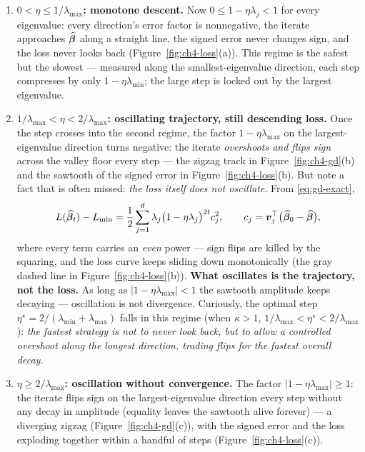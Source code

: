 \begin{enumerate}[label=Regime \arabic*:, leftmargin=5.5em]
  \item \textbf{$0 < \eta \le 1/\lambda_{\max}$: monotone descent.} Now $0 \le 1 - \eta\lambda_j < 1$ for every eigenvalue: every direction's error factor is nonnegative, the iterate approaches $\widehat{\bm{\beta}}$ along a straight line, the signed error never changes sign, and the loss never looks back (Figure~\ref{fig:ch4-loss}(a)). This regime is the safest but the slowest — measured along the smallest-eigenvalue direction, each step compresses by only $1 - \eta\lambda_{\min}$; the large step is locked out by the largest eigenvalue.
  \item \textbf{$1/\lambda_{\max} < \eta < 2/\lambda_{\max}$: oscillating trajectory, still descending loss.} Once the step crosses into the second regime, the factor $1 - \eta\lambda_{\max}$ on the largest-eigenvalue direction turns negative: the iterate \emph{overshoots and flips sign} across the valley floor every step — the zigzag track in Figure~\ref{fig:ch4-gd}(b) and the sawtooth of the signed error in Figure~\ref{fig:ch4-loss}(b). But note a fact that is often missed: \emph{the loss itself does not oscillate}. From \eqref{eq:gd-exact},
  \[
    L(\widehat{\bm{\beta}}_t) - L_{\min}
    = \frac12 \sum_{j=1}^{d} \lambda_j \big( 1 - \eta \lambda_j \big)^{2t} c_j^2,
    \qquad c_j = \bm{v}_j^\top \big( \widehat{\bm{\beta}}_0 - \widehat{\bm{\beta}} \big),
  \]
  where every term carries an \emph{even} power — sign flips are killed by the squaring, and the loss curve keeps sliding down monotonically (the gray dashed line in Figure~\ref{fig:ch4-loss}(b)). \textbf{What oscillates is the trajectory, not the loss.} As long as $|1 - \eta\lambda_{\max}| < 1$ the sawtooth amplitude keeps decaying — oscillation is not divergence. Curiously, the optimal step $\eta^\star = 2/(\lambda_{\min} + \lambda_{\max})$ falls in this regime (when $\kappa > 1$, $1/\lambda_{\max} < \eta^\star < 2/\lambda_{\max}$): \emph{the fastest strategy is not to never look back, but to allow a controlled overshoot along the longest direction, trading flips for the fastest overall decay}.
  \item \textbf{$\eta \ge 2/\lambda_{\max}$: oscillation without convergence.} The factor $|1 - \eta\lambda_{\max}| \ge 1$: the iterate flips sign on the largest-eigenvalue direction every step without any decay in amplitude (equality leaves the sawtooth alive forever) — a diverging zigzag (Figure~\ref{fig:ch4-gd}(c)), with the signed error and the loss exploding together within a handful of steps (Figure~\ref{fig:ch4-loss}(c)).
\end{enumerate}

